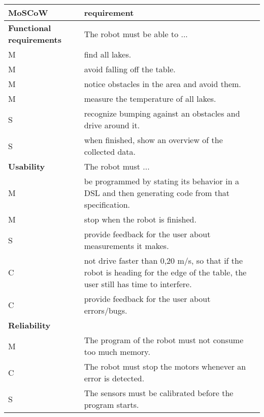 \documentclass[11pt,a4paper]{article}
\begin{document}
\begin{tabular}{|p{5cm}|p{10cm}|} 
\hline
MoSCoW & requirement\\
\hline
\hline
  \textbf{Functional requirements} & The robot must be able to ...\\
\hline
M & find all lakes.\\
M & avoid falling off the table.\\
M & notice obstacles in the area and avoid them.\\
M & measure the temperature of all lakes.\\
S & recognize bumping against an obstacles and drive around it.\\
S & when finished, show an overview of the collected data.\\
\hline

  \textbf{Usability} & The robot must ...\\
\hline
M & be programmed by stating its behavior in a DSL and then generating code from that specification.\\
M & stop when the robot is finished.\\
S & provide feedback for the user about measurements it makes.\\
C & not drive faster than 0,20 m/s, so that if the robot is heading for the edge of the table, the user still has time to interfere.\\
C & provide feedback for the user about errors/bugs.\\
\hline

  \textbf{Reliability}& \\
\hline
M & The program of the robot must not consume too much memory.\\
C & The robot must stop the motors whenever an error is detected.\\
S & The sensors must be calibrated before the program starts.\\
\hline


\end{tabular}
\end{document}
